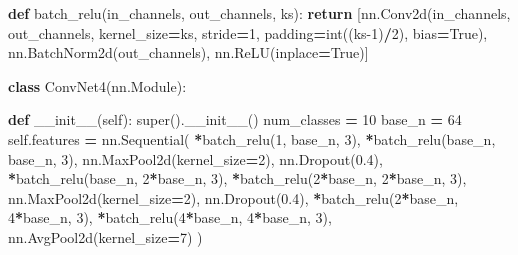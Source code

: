 \documentclass[10pt,a4paper]{article}
\newenvironment{Shaded}{\begin{snugshade}}{\end{snugshade}}
\newcommand{\BuiltInTok}[1]{#1}
\newcommand{\ControlFlowTok}[1]{\textcolor[rgb]{0.13,0.29,0.53}{\textbf{#1}}}
\newcommand{\DecValTok}[1]{\textcolor[rgb]{0.00,0.00,0.81}{#1}}
\newcommand{\FloatTok}[1]{\textcolor[rgb]{0.00,0.00,0.81}{#1}}
\newcommand{\FunctionTok}[1]{\textcolor[rgb]{0.00,0.00,0.00}{#1}}
\newcommand{\KeywordTok}[1]{\textcolor[rgb]{0.13,0.29,0.53}{\textbf{#1}}}
\newcommand{\NormalTok}[1]{#1}
\newcommand{\OperatorTok}[1]{\textcolor[rgb]{0.81,0.36,0.00}{\textbf{#1}}}
\newcommand{\VariableTok}[1]{\textcolor[rgb]{0.00,0.00,0.00}{#1}}
\theoremstyle{break}
\begin{document}
\begin{Shaded}
\begin{Highlighting}[]
\KeywordTok{def}\NormalTok{ batch_relu(in_channels, out_channels, ks):}
    \ControlFlowTok{return}\NormalTok{ [nn.Conv2d(in_channels, out_channels,}
\NormalTok{                  kernel_size}\OperatorTok{=}\NormalTok{ks,}
\NormalTok{                  stride}\OperatorTok{=}\DecValTok{1}\NormalTok{,}
\NormalTok{                  padding}\OperatorTok{=}\BuiltInTok{int}\NormalTok{((ks}\DecValTok{-1}\NormalTok{)}\OperatorTok{/}\DecValTok{2}\NormalTok{), bias}\OperatorTok{=}\VariableTok{True}\NormalTok{),}
\NormalTok{        nn.BatchNorm2d(out_channels),}
\NormalTok{        nn.ReLU(inplace}\OperatorTok{=}\VariableTok{True}\NormalTok{)]}
    
\KeywordTok{class}\NormalTok{ ConvNet4(nn.Module):}

    \KeywordTok{def} \FunctionTok{__init__}\NormalTok{(}\VariableTok{self}\NormalTok{):}
        \BuiltInTok{super}\NormalTok{().}\FunctionTok{__init__}\NormalTok{()}
\NormalTok{        num_classes }\OperatorTok{=} \DecValTok{10}
\NormalTok{        base_n }\OperatorTok{=} \DecValTok{64}
        \VariableTok{self}\NormalTok{.features }\OperatorTok{=}\NormalTok{ nn.Sequential(}
            \OperatorTok{*}\NormalTok{batch_relu(}\DecValTok{1}\NormalTok{, base_n, }\DecValTok{3}\NormalTok{),}
            \OperatorTok{*}\NormalTok{batch_relu(base_n, base_n, }\DecValTok{3}\NormalTok{),}
\NormalTok{            nn.MaxPool2d(kernel_size}\OperatorTok{=}\DecValTok{2}\NormalTok{),}
\NormalTok{            nn.Dropout(}\FloatTok{0.4}\NormalTok{),}
            \OperatorTok{*}\NormalTok{batch_relu(base_n, }\DecValTok{2}\OperatorTok{*}\NormalTok{base_n, }\DecValTok{3}\NormalTok{),}
            \OperatorTok{*}\NormalTok{batch_relu(}\DecValTok{2}\OperatorTok{*}\NormalTok{base_n, }\DecValTok{2}\OperatorTok{*}\NormalTok{base_n, }\DecValTok{3}\NormalTok{),}
\NormalTok{            nn.MaxPool2d(kernel_size}\OperatorTok{=}\DecValTok{2}\NormalTok{),}
\NormalTok{            nn.Dropout(}\FloatTok{0.4}\NormalTok{),}
            \OperatorTok{*}\NormalTok{batch_relu(}\DecValTok{2}\OperatorTok{*}\NormalTok{base_n, }\DecValTok{4}\OperatorTok{*}\NormalTok{base_n, }\DecValTok{3}\NormalTok{),}
            \OperatorTok{*}\NormalTok{batch_relu(}\DecValTok{4}\OperatorTok{*}\NormalTok{base_n, }\DecValTok{4}\OperatorTok{*}\NormalTok{base_n, }\DecValTok{3}\NormalTok{),}
\NormalTok{            nn.AvgPool2d(kernel_size}\OperatorTok{=}\DecValTok{7}\NormalTok{)}
\NormalTok{        )}


\end{Highlighting}
\end{Shaded}
\end{document}
